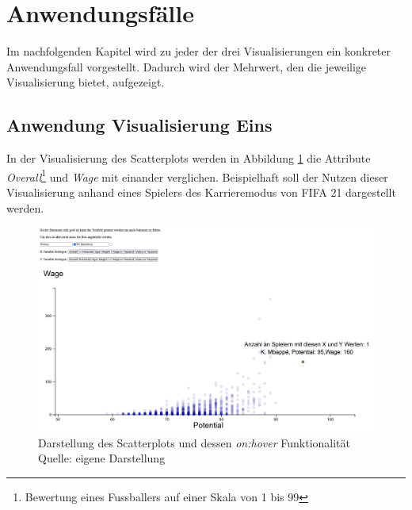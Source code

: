 \documentclass[usegeometry=true]{scrartcl}
\begin{document}

\section{Anwendungsfälle}

Im nachfolgenden Kapitel wird zu jeder der drei Visualisierungen ein konkreter Anwendungsfall vorgestellt. Dadurch wird der Mehrwert, den die jeweilige Visualisierung bietet, aufgezeigt.  



\subsection{Anwendung Visualisierung Eins}
In der Visualisierung des Scatterplots werden in Abbildung \ref{SP5} die Attribute \textit{Overall}\footnote{Bewertung eines Fussballers auf einer Skala von 1 bis 99} und \textit{Wage} mit einander verglichen. Beispielhaft soll der Nutzen dieser Visualisierung anhand eines Spielers des Karrieremodus von FIFA 21 dargestellt werden.\\
\begin{figure}[h!]
\centering
\includegraphics[scale=0.5]{grafiken/Scatterplot5}
\caption{Darstellung des Scatterplots und dessen \textit{on:hover} Funktionalität\\ Quelle: eigene Darstellung}
\label{SP5}
\end{figure}
\end{document}
